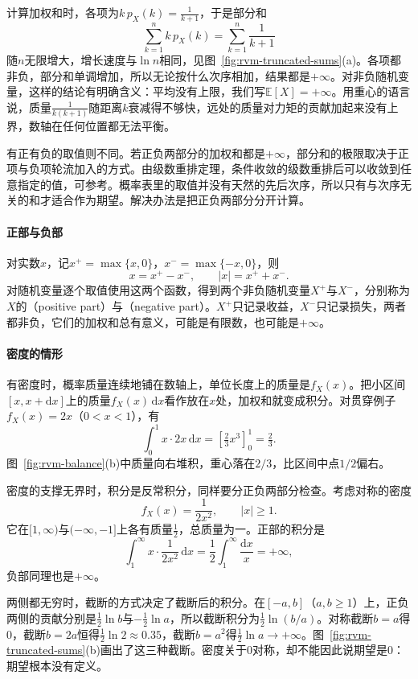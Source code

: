 计算加权和时，各项为$k\,p_X(k)=\frac{1}{k+1}$，于是部分和
\[
 \sum_{k=1}^{n}k\,p_X(k)=\sum_{k=1}^{n}\frac{1}{k+1}
\]
随$n$无限增大，增长速度与$\ln n$相同，见图~\ref{fig:rvm-truncated-sums}(a)。各项都非负，部分和单调增加，所以无论按什么次序相加，结果都是$+\infty$。对非负随机变量，这样的结论有明确含义：平均没有上限，我们写$\mathbb{E}[X]=+\infty$。用重心的语言说，质量$\frac{1}{k(k+1)}$随距离$k$衰减得不够快，远处的质量对力矩的贡献加起来没有上界，数轴在任何位置都无法平衡。

有正有负的取值则不同。若正负两部分的加权和都是$+\infty$，部分和的极限取决于正项与负项轮流加入的方式。由级数重排定理，条件收敛的级数重排后可以收敛到任意指定的值，可参考。概率表里的取值并没有天然的先后次序，所以只有与次序无关的和才适合作为期望。解决办法是把正负两部分分开计算。

\paragraph{正部与负部}
对实数$x$，记$x^{+}=\max\{x,0\}$，$x^{-}=\max\{-x,0\}$，则
\begin{equation}
 x=x^{+}-x^{-},\qquad \lvert x\rvert=x^{+}+x^{-} .
 \label{eq:rvm-pos-neg}
\end{equation}
对随机变量逐个取值使用这两个函数，得到两个非负随机变量$X^{+}$与$X^{-}$，分别称为$X$的（positive part）与（negative part）。$X^{+}$只记录收益，$X^{-}$只记录损失，两者都非负，它们的加权和总有意义，可能是有限数，也可能是$+\infty$。

\paragraph{密度的情形}
有密度时，概率质量连续地铺在数轴上，单位长度上的质量是$f_X(x)$。把小区间$[x,x+\mathrm{d}x]$上的质量$f_X(x)\,\mathrm{d}x$看作放在$x$处，加权和就变成积分。对贯穿例子$f_X(x)=2x$（$0<x<1$），有
\[
 \int_0^1x\cdot2x\,\mathrm{d}x=\left[\tfrac23x^{3}\right]_0^1=\tfrac23 .
\]
图~\ref{fig:rvm-balance}(b)中质量向右堆积，重心落在$2/3$，比区间中点$1/2$偏右。

密度的支撑无界时，积分是反常积分，同样要分正负两部分检查。考虑对称的密度
\[
 f_X(x)=\frac{1}{2x^{2}},\qquad \lvert x\rvert\geq1 .
\]
它在$[1,\infty)$与$(-\infty,-1]$上各有质量$\tfrac12$，总质量为一。正部的积分是
\[
 \int_1^{\infty}x\cdot\frac{1}{2x^{2}}\,\mathrm{d}x=\frac12\int_1^{\infty}\frac{\mathrm{d}x}{x}=+\infty,
\]
负部同理也是$+\infty$。

两侧都无穷时，截断的方式决定了截断后的积分。在$[-a,b]$（$a,b\geq1$）上，正负两侧的贡献分别是$\frac12\ln b$与$-\frac12\ln a$，所以截断积分为$\frac12\ln(b/a)$。对称截断$b=a$得$0$，截断$b=2a$恒得$\frac12\ln2\approx0.35$，截断$b=a^{2}$得$\frac12\ln a\to+\infty$。图~\ref{fig:rvm-truncated-sums}(b)画出了这三种截断。密度关于$0$对称，却不能因此说期望是$0$：期望根本没有定义。

